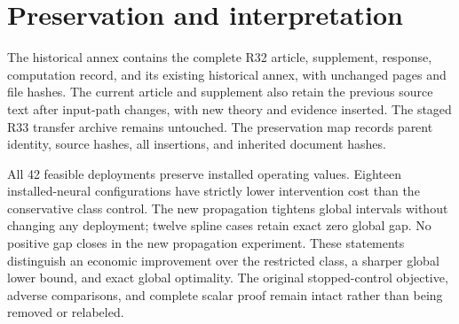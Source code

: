 \section{Preservation and interpretation}
The historical annex contains the complete R32 article, supplement, response, computation record, and its existing historical annex, with unchanged pages and file hashes. The current article and supplement also retain the previous source text after input-path changes, with new theory and evidence inserted. The staged R33 transfer archive remains untouched. The preservation map records parent identity, source hashes, all insertions, and inherited document hashes.

All 42 feasible deployments preserve installed operating values. Eighteen installed-neural configurations have strictly lower intervention cost than the conservative class control. The new propagation tightens \RestartTightened{} global intervals without changing any deployment; twelve spline cases retain exact zero global gap. No positive gap closes in the new propagation experiment. These statements distinguish an economic improvement over the restricted class, a sharper global lower bound, and exact global optimality. The original stopped-control objective, adverse comparisons, and complete scalar proof remain intact rather than being removed or relabeled.
